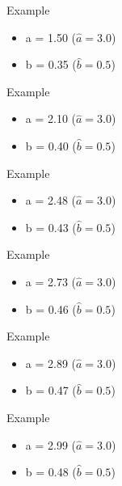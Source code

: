 \begin{frame}{Example}
  \begin{itemize}
    \item a = 1.50 ($\hat{a} = 3.0$)
    \item b = 0.35 ($\hat{b} = 0.5$)
  \end{itemize}
\end{frame}

\begin{frame}{Example}
  \begin{itemize}
    \item a = 2.10 ($\hat{a} = 3.0$)
    \item b = 0.40 ($\hat{b} = 0.5$)
  \end{itemize}
\end{frame}

\begin{frame}{Example}
  \begin{itemize}
    \item a = 2.48 ($\hat{a} = 3.0$)
    \item b = 0.43 ($\hat{b} = 0.5$)
  \end{itemize}
\end{frame}

\begin{frame}{Example}
  \begin{itemize}
    \item a = 2.73 ($\hat{a} = 3.0$)
    \item b = 0.46 ($\hat{b} = 0.5$)
  \end{itemize}
\end{frame}

\begin{frame}{Example}
  \begin{itemize}
    \item a = 2.89 ($\hat{a} = 3.0$)
    \item b = 0.47 ($\hat{b} = 0.5$)
  \end{itemize}
\end{frame}

\begin{frame}{Example}
  \begin{itemize}
    \item a = 2.99 ($\hat{a} = 3.0$)
    \item b = 0.48 ($\hat{b} = 0.5$)
  \end{itemize}
\end{frame}

